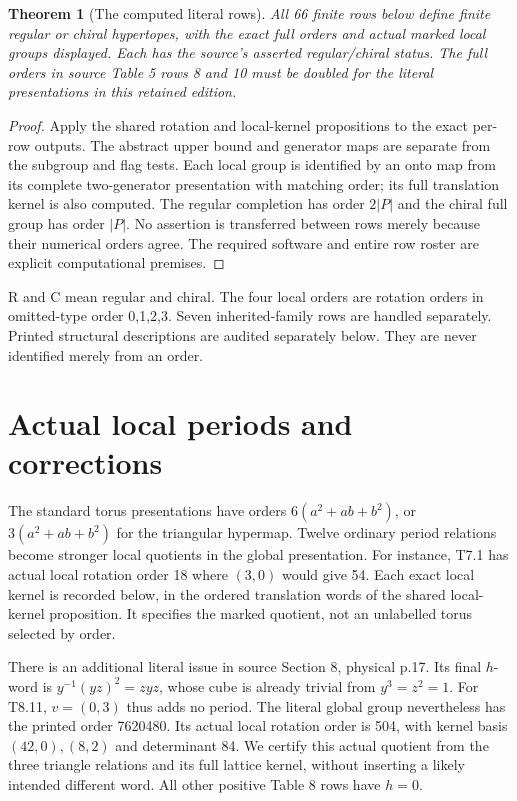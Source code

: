 \documentclass[10pt,a4paper]{article}
\newtheorem{theorem}{Theorem}\newtheorem{proposition}{Proposition}
\begin{document}
\begin{theorem}[The computed literal rows]
All 66 finite rows below define finite regular or chiral hypertopes,
with the exact full orders and actual marked local groups displayed.
Each has the source's asserted regular/chiral status. The full orders
in source Table 5 rows 8 and 10 must be doubled for the literal
presentations in this retained edition.
\end{theorem}
\begin{proof}
Apply the shared rotation and local-kernel propositions to the exact
per-row outputs. The abstract upper bound and generator maps are
separate from the subgroup and flag tests. Each local group is
identified by an onto map from its complete two-generator presentation
with matching order; its full translation kernel is also computed.
The regular completion has order $2|P|$ and the chiral full group has
order $|P|$. No assertion is transferred between rows merely because
their numerical orders agree. The required software and entire row
roster are explicit computational premises.
\end{proof}
R and C mean regular and chiral. The four local orders are rotation
orders in omitted-type order 0,1,2,3. Seven inherited-family rows are
handled separately. Printed structural descriptions are audited separately below. They are
never identified merely from an order.
\small\normalsize

\section{Actual local periods and corrections}
The standard torus presentations have orders $6(a^2+ab+b^2)$, or
$3(a^2+ab+b^2)$ for the triangular hypermap. Twelve ordinary period
relations become stronger local quotients in the global presentation.
For instance, T7.1 has actual local rotation order 18 where $(3,0)$
would give 54. Each exact local kernel is recorded below, in the ordered
translation words of the shared local-kernel proposition. It specifies
the marked quotient, not an unlabelled torus selected by order.
\small\normalsize

There is an additional literal issue in source Section 8, physical p.17.
Its final $h$-word is $y^{-1}(yz)^2=zyz$, whose cube is already trivial
from $y^3=z^2=1$. For T8.11, $v=(0,3)$ thus adds no period.
The literal global group nevertheless has the printed order 7620480.
Its actual local rotation order is 504, with kernel basis $(42,0),(8,2)$
and determinant 84. We certify this actual quotient from the three
triangle relations and its full lattice kernel, without inserting a
likely intended different word. All other positive Table 8 rows have $h=0$.
\end{document}
